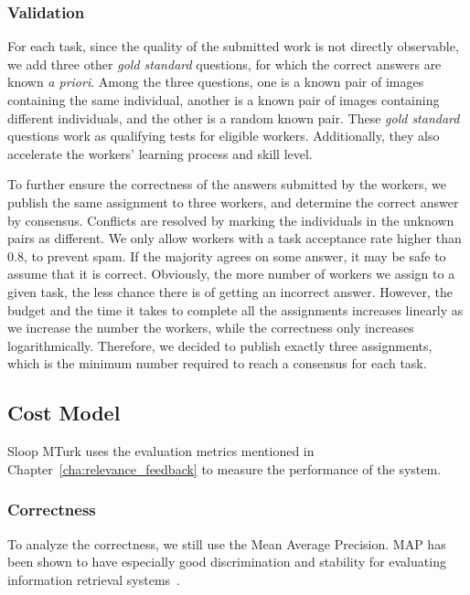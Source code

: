   \subsubsection{Validation}
  \label{subsub:validation} %

  For each task, since the quality of the submitted work is not directly
  observable, we add three other \emph{gold standard} questions, for which the
  correct answers are known \emph{a priori}. Among the three questions, one is a known
  pair of images containing the same individual, another is a known pair of
  images containing different individuals, and the other is a random known pair.
  These \emph{gold standard} questions work as qualifying tests for eligible
  workers. Additionally, they also accelerate the workers' learning process and
  skill level.

  To further ensure the correctness of the answers submitted by the workers, we
  publish the same assignment to three workers, and determine the correct answer
  by consensus. Conflicts are resolved by marking the individuals in the unknown
  pairs as different. We only allow workers with a task acceptance rate higher than
  0.8, to prevent spam. If the majority agrees on some answer, it may be safe to
  assume that it is correct. Obviously, the more number of workers we assign to a
  given task, the less chance there is of getting an incorrect answer. However,
  the budget and the time it takes to complete all the assignments increases
  linearly as we increase the number the workers, while the
  correctness only increases logarithmically. Therefore, we decided to publish
  exactly three assignments, which is the minimum number required to reach a consensus
  for each task.

  \subsection{Cost Model}

  Sloop MTurk uses the evaluation metrics mentioned in
  Chapter~\ref{cha:relevance_feedback} to measure the performance of the system.

  \subsubsection{Correctness}

  To analyze the correctness, we still use the Mean Average Precision.  MAP has
  been shown to have especially good discrimination and stability for evaluating
  information retrieval
  systems~\cite{manning2008introduction}.

